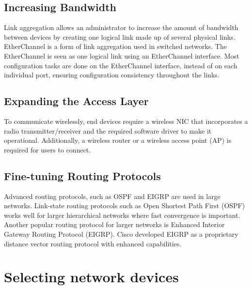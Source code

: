 \subsection{Increasing Bandwidth}
Link aggregation allows an administrator to increase the amount of bandwidth between devices by creating one logical link made up of several physical links. EtherChannel is a form of link aggregation used in switched networks. The EtherChannel is seen as one logical link using an EtherChannel interface. Most configuration tasks are done on the EtherChannel interface, instead of on each individual port, ensuring configuration consistency throughout the links.
\subsection{Expanding the Access Layer}
To communicate wirelessly, end devices require a wireless NIC that incorporates a radio transmitter/receiver and the required software driver to make it operational. Additionally, a wireless router or a wireless access point (AP) is required for users to connect.
\subsection{Fine-tuning Routing Protocols}
Advanced routing protocols, such as OSPF and EIGRP are used in large networks. Link-state routing protocols such as Open Shortest Path First (OSPF) works well for larger hierarchical networks where fast convergence is important. Another popular routing protocol for larger networks is Enhanced Interior Gateway Routing Protocol (EIGRP). Cisco developed EIGRP as a proprietary distance vector routing protocol with enhanced capabilities.

\section{Selecting network devices}
